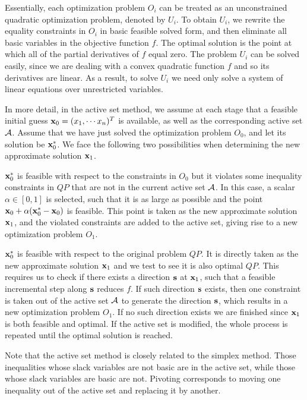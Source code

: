 \documentclass{article}
\begin{document}
Essentially, each optimization problem $O_i$ can be treated as an unconstrained
quadratic optimization problem, denoted by $U_i$. To obtain $U_i$, we
rewrite the equality constraints in $O_i$ in basic feasible solved
form, and then eliminate all basic variables in the objective function $f$.
The optimal solution is the point at which all of the partial derivatives of 
$f$ equal zero. The problem $U_i$ can be solved easily, since we are 
dealing with a convex quadratic function $f$ and so 
its derivatives are linear. 
As a result, to solve $U_i$ we need only solve a system of
linear equations over unrestricted variables. 

In more detail,
in the active set method, we assume at each stage
that a feasible initial guess 
${\bf x}_0 = (x_1, \cdots x_n)^T$ is available, as well as the corresponding
active set ${\cal A}$\@. 
Assume that we have just solved the optimization problem $O_0$, and let its 
solution be ${\bf x}^\ast_0$. We  face the following two possibilities 
when determining the new approximate solution ${\bf x}_1$. 
\item ${\bf x}^\ast_0$ is feasible with respect
 to the constraints in $O_0$ but it
violates some inequality constraints in $QP$ that are not in the current
active set ${\cal A}$. In this case, a scalar $\alpha \in [0,1]$ is 
selected, such that it is as large as possible and the point ${\bf x}_0 + \alpha
({\bf x}^\ast_0 - {\bf x}_0) $ is feasible. This point is taken as the new approximate
solution ${\bf x}_1$, and the violated constraints are added to the active
set, giving rise to a new optimization problem $O_1$. 
\item ${\bf x}^\ast_0$ is feasible with respect to the original problem $QP$\@.
It is directly taken as the new 
approximate solution ${\bf x}_1$ and we test to see it is  also
optimal $QP$. This requires us to 
check if there exists a direction ${\bf s}$ at ${\bf x}_1$, such that a feasible
incremental step along ${\bf s}$ reduces $f$. If such direction ${\bf s}$ exists,
then one constraint is taken out of the active set ${\cal A}$ 
to generate the direction ${\bf s}$, which results in a new 
optimization problem $O_1$. If no such direction exists we are finished
since ${\bf x}_1$ is both feasible and optimal.
\el
%
If the active set is modified, the whole process is repeated until 
the optimal solution is reached.




Note that the active set method is closely related to the simplex method. Those
inequalities whose slack variables are not basic are in the active set,
while those whose slack variables are basic are not.  Pivoting corresponds
to moving one inequality out of the active set and replacing it by another.
\end{document}

